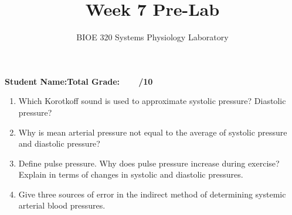 \documentclass{article}
\title{Week 7 Pre-Lab}
\author{BIOE 320 Systems Physiology Laboratory}
\date{}
\begin{document}
\maketitle
\large

\textbf{Student Name:}\hfill 	\textbf{Total Grade:\ \ \ \ /10}\vspace{0.5cm}

\begin{enumerate}
	\item Which Korotkoff sound is used to approximate systolic pressure? Diastolic pressure?
	\item Why is mean arterial pressure not equal to the average of systolic pressure and diastolic pressure?
	\item Define pulse pressure. Why does pulse pressure increase during exercise? Explain in terms of changes in systolic and diastolic pressures.
	\item Give three sources of error in the indirect method of determining systemic arterial blood pressures.
\end{enumerate}
\end{document}
